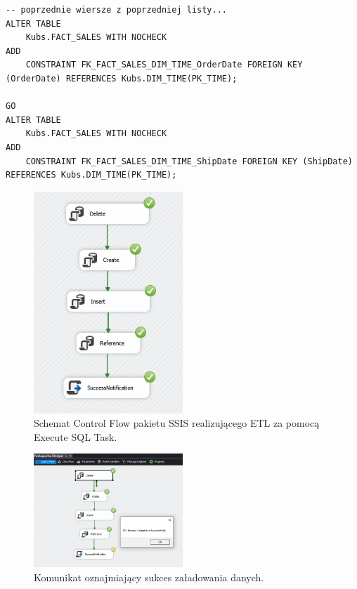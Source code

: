 \documentclass[a4paper,12pt]{article}
\begin{document}
\begin{lstlisting}[caption={Dodanie nowych CONSTRAINT}]
-- poprzednie wiersze z poprzedniej listy...
ALTER TABLE
    Kubs.FACT_SALES WITH NOCHECK
ADD
    CONSTRAINT FK_FACT_SALES_DIM_TIME_OrderDate FOREIGN KEY (OrderDate) REFERENCES Kubs.DIM_TIME(PK_TIME);

GO
ALTER TABLE
    Kubs.FACT_SALES WITH NOCHECK
ADD
    CONSTRAINT FK_FACT_SALES_DIM_TIME_ShipDate FOREIGN KEY (ShipDate) REFERENCES Kubs.DIM_TIME(PK_TIME);
\end{lstlisting}

\begin{figure}[H]
    \centering
    \includegraphics[width=0.5\textwidth]{images/4_success_2.png}
    \caption{Schemat Control Flow pakietu SSIS realizującego ETL za pomocą Execute SQL Task.}
    \label{fig:zad4_control_flow_2}
\end{figure}

\begin{figure}[H]
    \centering
    \includegraphics[width=0.5\textwidth]{images/4_success.png}
    \caption{Komunikat oznajmiający sukces załadowania danych.}
    \label{fig:zad4_control_flow}
\end{figure}
\end{document}
